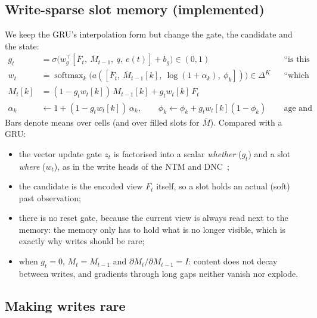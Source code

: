 \documentclass[11pt,a4paper]{article}
\begin{document}
\subsection{Write-sparse slot memory (implemented)}

We keep the GRU's interpolation form but change the gate, the candidate and the state:
\begin{align}
g_t &= \sigma\big(w_g^\top[\bar F_t,\ \bar M_{t-1},\ q,\ e(t)] + b_g\big) \in (0,1)
  && \text{``is this view worth saving?''} \\
w_t &= \operatorname{softmax}_k\big(a([\bar F_t,\ \bar M_{t-1}[k],\ \log(1+\alpha_k),\ \phi_k])\big) \in \Delta^K
  && \text{``which slot does it replace?''}\\
M_t[k] &= (1 - g_t w_t[k])\, M_{t-1}[k] + g_t w_t[k]\, F_t \\
\alpha_k &\leftarrow 1 + (1-g_t w_t[k])\,\alpha_k, \qquad \phi_k \leftarrow \phi_k + g_t w_t[k](1-\phi_k)
  && \text{age and fill of each slot}
\end{align}
Bars denote means over cells (and over filled slots for $\bar M$). Compared with a GRU:
\begin{itemize}
  \item the vector update gate $z_t$ is factorised into a scalar \emph{whether} ($g_t$) and a slot \emph{where}
  ($w_t$), as in the write heads of the NTM and DNC~\cite{graves2014ntm,graves2016dnc};
  \item the candidate is the encoded view $F_t$ itself, so a slot holds an actual (soft) past observation;
  \item there is no reset gate, because the current view is always read next to the memory: the memory only has to
  hold what is no longer visible, which is exactly why writes should be rare;
  \item when $g_t = 0$, $M_t = M_{t-1}$ and $\partial M_t / \partial M_{t-1} = I$: content does not decay between
  writes, and gradients through long gaps neither vanish nor explode.
\end{itemize}

\subsection{Making writes rare}
\end{document}
